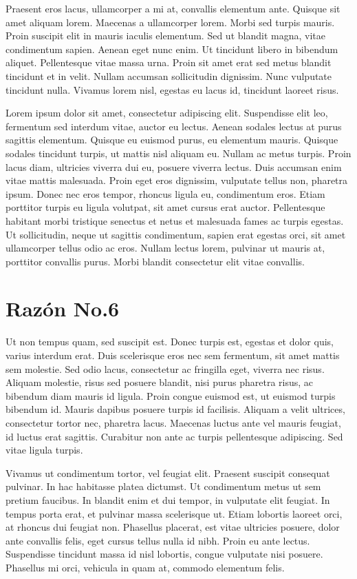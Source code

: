 \documentclass[11pt,letterpaper]{article}
\begin{document}
Praesent eros lacus, ullamcorper a mi at, convallis elementum ante. Quisque sit amet aliquam lorem. Maecenas a ullamcorper lorem. Morbi sed turpis mauris. Proin suscipit elit in mauris iaculis elementum. Sed ut blandit magna, vitae condimentum sapien. Aenean eget nunc enim. Ut tincidunt libero in bibendum aliquet. Pellentesque vitae massa urna. Proin sit amet erat sed metus blandit tincidunt et in velit. Nullam accumsan sollicitudin dignissim. Nunc vulputate tincidunt nulla. Vivamus lorem nisl, egestas eu lacus id, tincidunt laoreet risus.

Lorem ipsum dolor sit amet, consectetur adipiscing elit. Suspendisse elit leo, fermentum sed interdum vitae, auctor eu lectus. Aenean sodales lectus at purus sagittis elementum. Quisque eu euismod purus, eu elementum mauris. Quisque sodales tincidunt turpis, ut mattis nisl aliquam eu. Nullam ac metus turpis. Proin lacus diam, ultricies viverra dui eu, posuere viverra lectus. Duis accumsan enim vitae mattis malesuada. Proin eget eros dignissim, vulputate tellus non, pharetra ipsum. Donec nec eros tempor, rhoncus ligula eu, condimentum eros. Etiam porttitor turpis eu ligula volutpat, sit amet cursus erat auctor. Pellentesque habitant morbi tristique senectus et netus et malesuada fames ac turpis egestas. Ut sollicitudin, neque ut sagittis condimentum, sapien erat egestas orci, sit amet ullamcorper tellus odio ac eros. Nullam lectus lorem, pulvinar ut mauris at, porttitor convallis purus. Morbi blandit consectetur elit vitae convallis.

\section{Razón No.6}

Ut non tempus quam, sed suscipit est. Donec turpis est, egestas et dolor quis, varius interdum erat. Duis scelerisque eros nec sem fermentum, sit amet mattis sem molestie. Sed odio lacus, consectetur ac fringilla eget, viverra nec risus. Aliquam molestie, risus sed posuere blandit, nisi purus pharetra risus, ac bibendum diam mauris id ligula. Proin congue euismod est, ut euismod turpis bibendum id. Mauris dapibus posuere turpis id facilisis. Aliquam a velit ultrices, consectetur tortor nec, pharetra lacus. Maecenas luctus ante vel mauris feugiat, id luctus erat sagittis. Curabitur non ante ac turpis pellentesque adipiscing. Sed vitae ligula turpis.

Vivamus ut condimentum tortor, vel feugiat elit. Praesent suscipit consequat pulvinar. In hac habitasse platea dictumst. Ut condimentum metus ut sem pretium faucibus. In blandit enim et dui tempor, in vulputate elit feugiat. In tempus porta erat, et pulvinar massa scelerisque ut. Etiam lobortis laoreet orci, at rhoncus dui feugiat non. Phasellus placerat, est vitae ultricies posuere, dolor ante convallis felis, eget cursus tellus nulla id nibh. Proin eu ante lectus. Suspendisse tincidunt massa id nisl lobortis, congue vulputate nisi posuere. Phasellus mi orci, vehicula in quam at, commodo elementum felis.\cite{ejemplo}
\end{document}
